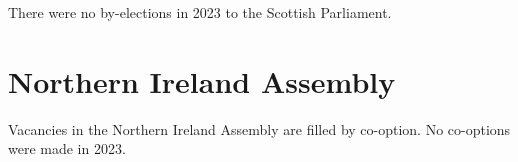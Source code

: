 \documentclass[a4paper,openany]{book}
\begin{document}
There were no by-elections in 2023 to the Scottish Parliament.

%
%
%

%
%

\section{Northern Ireland Assembly}

Vacancies in the Northern Ireland Assembly are filled by co-option.
No co-options were made in 2023.
%
\end{document}

